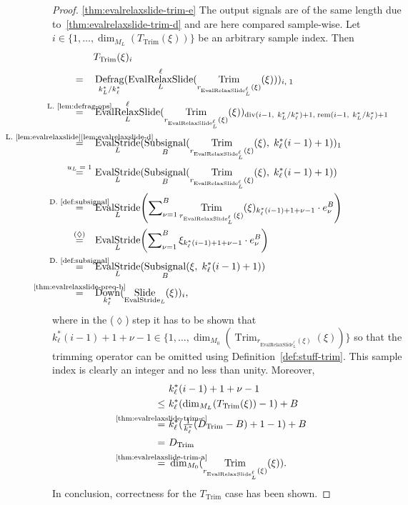 \documentclass[journal]{IEEEtran}
\newcommand{\ROI}{B}
\newcommand{\discint}[2]{\{#1,\dotsc,#2\}}
\newcommand{\inint}[2]{\in\discint{#1}{#2}}
\DeclareMathOperator{\Subsignal}{Subsignal}
\DeclareMathOperator{\Slide}{Slide}
\DeclareMathOperator{\Defragmentation}{Defrag}
\DeclareMathOperator{\EvalStride}{EvalStride}
\DeclareMathOperator{\Trimming}{Trim}
\renewcommand{\div}[2]{\operatorname{div}(#1,\ #2)}
\newcommand{\rem}[2]{\operatorname{rem}(#1,\ #2)}
\newcommand{\equsing}[1]{\overset{\mathclap{\text{#1}}}{=}}
\DeclareMathOperator{\EvalRelaxSlide}{EvalRelaxSlide}
\DeclareMathOperator{\Downsampling}{Down}
\begin{document}
\begin{proof}
\ref{thm:evalrelaxslide-trim-e}
The output signals are of the same length due to~\ref{thm:evalrelaxslide-trim-d} and are here compared sample-wise.
Let $i\inint{1}{\dim_{M_L}( T_{\Trimming}(\xi) )}$ be an arbitrary sample index.
Then
\begin{align*}
  & T_{\Trimming}(\xi)_i\\
  =\ \ \ & \Defragmentation_{k_L^* / k_\ell^*}( \EvalRelaxSlide_L^\ell( \Trimming_{r_{\EvalRelaxSlide_L^\ell}(\xi)}(\xi) ) )_{i,\;1}\\
  \equsing{L.~\ref{lem:defrag-ops}}\ \ \ & \EvalRelaxSlide_L^\ell( \Trimming_{r_{\EvalRelaxSlide_L^\ell}(\xi)}(\xi) )_{\div{i - 1}{k_L^* / k_\ell^*} + 1,\;\rem{i - 1}{k_L^* / k_\ell^*} + 1}\\
  \equsing{L.~\ref{lem:evalrelaxslide}\ref{lem:evalrelaxslide-d}}\ \ \ & \EvalStride_L(\Subsignal_\ROI(\Trimming_{r_{\EvalRelaxSlide_L^\ell}(\xi)}(\xi),\; k_\ell^*(i - 1) + 1))_1\\
  \equsing{$u_L = 1$}\ \ \ & \EvalStride_L(\Subsignal_\ROI(\Trimming_{r_{\EvalRelaxSlide_L^\ell}(\xi)}(\xi),\; k_\ell^*(i - 1) + 1))\\
  \equsing{D.~\ref{def:subsignal}}\ \ \ & \EvalStride_L\!\left(\sum\nolimits_{\nu = 1}^\ROI \Trimming_{r_{\EvalRelaxSlide_L^\ell}(\xi)}(\xi)_{k_\ell^*(i - 1) + 1 + \nu - 1}\cdot e_\nu^\ROI\right)\\
  \equsing{($\lozenge$)}\ \ \ & \EvalStride_L\!\left(\sum\nolimits_{\nu = 1}^\ROI \xi_{k_\ell^*(i - 1) + 1 + \nu - 1}\cdot e_\nu^\ROI\right)\\
  \equsing{D.~\ref{def:subsignal}}\ \ \ & \EvalStride_L(\Subsignal_\ROI(\xi,\; k_\ell^*(i - 1) + 1))\\
  \equsing{\ref{thm:evalrelaxslide-preq-b}}\ \ \ & \Downsampling_{k_\ell^*}( \Slide_{\EvalStride_L}(\xi) )_i\text{,}
\end{align*}
where in the ($\lozenge$) step it has to be shown that $k_\ell^*(i - 1) + 1 + \nu - 1\inint{1}{\dim_{M_0}( \Trimming_{r_{\EvalRelaxSlide_L^\ell}(\xi)}(\xi) )}$ so that the trimming operator can be omitted using Definition~\ref{def:stuff-trim}.
This sample index is clearly an integer and no less than unity.
Moreover,
\begin{align*}
  & k_\ell^*(i - 1) + 1 + \nu - 1\\
  \leq\ & k_\ell^*(\dim_{M_L}( T_{\Trimming}(\xi) ) - 1) + \ROI\\
  \equsing{\ref{thm:evalrelaxslide-trim-c}}\ & k_\ell^*(\tfrac{1}{k_\ell^*}(D_{\Trimming} - \ROI) + 1 - 1) + \ROI\\
  =\ & D_{\Trimming}\\
  \equsing{\ref{thm:evalrelaxslide-trim-a}}\ & \dim_{M_0}( \Trimming_{r_{\EvalRelaxSlide_L^\ell}(\xi)}(\xi) )\text{.}
\end{align*}
In conclusion, correctness for the $T_{\Trimming}$ case has been shown.


\end{proof}
\end{document}
